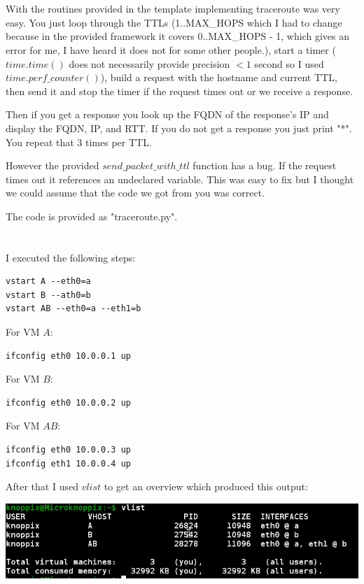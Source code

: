 \documentclass[12pt, a4paper]{article}
\begin{document}
\section{} %
With the routines provided in the template implementing traceroute was very easy. You just loop through the TTLs (1..MAX\_HOPS which I had to change because in the provided framework it covers 0..MAX\_HOPS - 1, which gives an error for me, I have heard it does not for some other people.), start a timer ($time.time()$ does not necessarily provide precision $<1$ second so I used $time.perf\_counter()$), build a request with the hostname and current TTL, then send it and stop the timer if the request times out or we receive a response.

Then if you get a response you look up the FQDN of the response's IP and display the FQDN, IP, and RTT. If you do not get a response you just print "*". You repeat that 3 times per TTL.

However the provided $send\_packet\_with\_ttl$ function has a bug. If the request times out it references an undeclared variable. This was easy to fix but I thought we could assume that the code we got from you was correct.

The code is provided as "traceroute.py".

\section{} %

I executed the following steps:

\begin{lstlisting}
vstart A --eth0=a
vstart B --ath0=b
vstart AB --eth0=a --eth1=b
\end{lstlisting}

For VM $A$:
\begin{lstlisting}
ifconfig eth0 10.0.0.1 up
\end{lstlisting}

For VM $B$:
\begin{lstlisting}
ifconfig eth0 10.0.0.2 up
\end{lstlisting}

For VM $AB$:
\begin{lstlisting}
ifconfig eth0 10.0.0.3 up
ifconfig eth1 10.0.0.4 up
\end{lstlisting}

After that I used $vlist$ to get an overview which produced this output:

\includegraphics[width=\linewidth]{screenshots/vlist}
\end{document}
